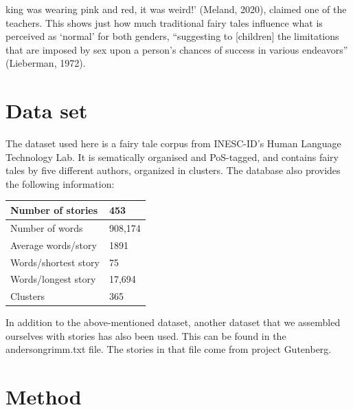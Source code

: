 \documentclass[11pt]{article}
\begin{document}
king was wearing pink and red, it was weird!’ (Meland, 2020), claimed one of the teachers. This shows just how much traditional fairy tales influence what is perceived as ‘normal’ for both genders, “suggesting to [children] the limitations that are imposed by sex upon a person's chances of success in various endeavors” (Lieberman, 1972). 



\section{Data set}

The dataset used here is a fairy tale corpus from INESC-ID's Human Language Technology Lab. It is sematically organised and PoS-tagged, and contains fairy tales by five different authors, organized in clusters. The database also provides the following information:

\begin{table}[H]
\centering
\begin{tabular}{@{}ll@{}}
\toprule
Number of stories           &   453         \\ \midrule
Number of words             &   908,174     \\
Average words/story         &   1891        \\
Words/shortest story        &   75          \\
Words/longest story         &   17,694      \\
Clusters                    &   365         \\ \bottomrule
\end{tabular}
\label{ml_features}
\end{table}
 
In addition to the above-mentioned dataset, another dataset that we assembled ourselves with stories has also been used. This can be found in the andersongrimm.txt file. The stories in that file come from project Gutenberg.

\section{Method}
\end{document}
